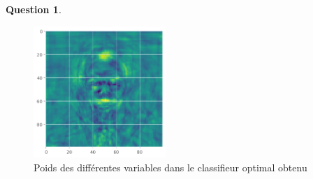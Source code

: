 \documentclass[11pt,a4paper]{article}
\theoremstyle{definition}
\newtheorem{Qu}{Question}
\begin{document}
\begin{Qu}
 
\begin{figure}[h!]\centering
\includegraphics[width=5cm]{Images/pixel.png}
\caption{Poids des différentes variables dans le classifieur optimal obtenu}
\label{pixel}
\end{figure}

\end{Qu}

\
\end{document}
